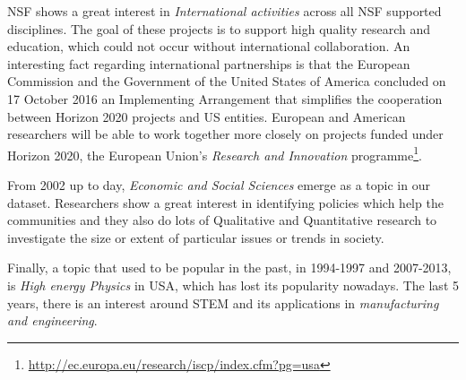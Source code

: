 \documentclass[12pt]{report}
\begin{document}
NSF shows a great interest in \emph{International activities} across all NSF
supported disciplines. The goal of these projects is to support high
quality research and education, which could not occur without
international collaboration.
An interesting fact regarding international partnerships is that the
European Commission and the Government of the United States of America
concluded on 17 October 2016 an Implementing Arrangement that
simplifies the cooperation between Horizon 2020 projects and US
entities. European and American researchers will be able to work
together more closely on projects funded under Horizon 2020, the
European Union's \emph{Research and Innovation}
programme\footnote{\url{http://ec.europa.eu/research/iscp/index.cfm?pg=usa}}.

From 2002 up to day, \emph{Economic and Social Sciences} emerge as a topic in our
dataset. Researchers show a great interest in identifying policies which help
the communities and they also do lots of Qualitative and Quantitative research
to investigate the size or extent of particular issues or trends in society.

Finally, a topic that used to be popular in the past, in 1994-1997 and
2007-2013, is \emph{High energy Physics} in USA, which has lost its popularity
nowadays. The last 5 years, there is an interest around STEM and its
applications in \emph{manufacturing and engineering}.
\end{document}
